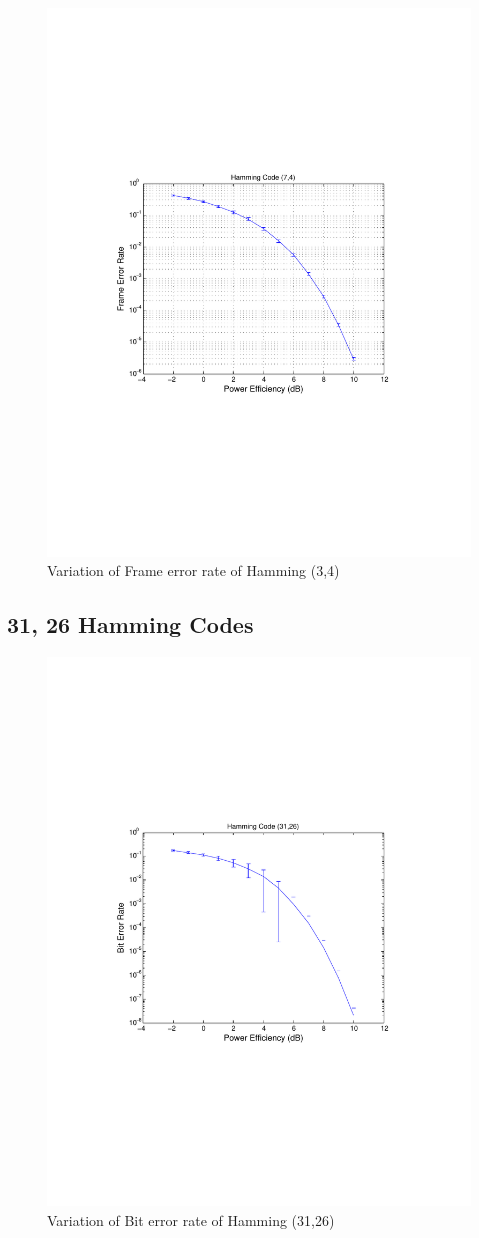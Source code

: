\documentclass[11pt, english]{article}
\begin{document}
\begin{figure}[H]
    \centering
    \includegraphics[width=.8\textwidth]{fer_hamming_3_4.pdf}
    \caption{Variation of Frame error rate of Hamming (3,4)}
    \label{f31}
\end{figure}
\subsection{31, 26 Hamming Codes}
\begin{figure}
    \centering
    \includegraphics[width=.8\textwidth]{hamming_31_26_ber.pdf}
    \caption{Variation of Bit error rate of Hamming (31,26)}
    \label{b31}
\end{figure}
\end{document}
